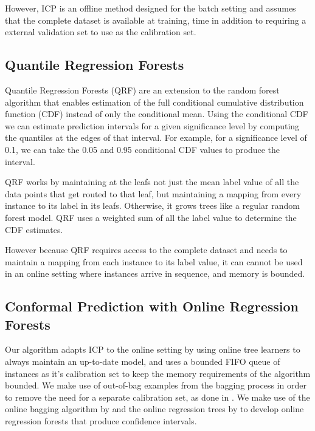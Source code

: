 However, ICP is an offline method designed for the batch setting and assumes that the complete
dataset is available at training, time in addition to requiring a external
validation set to use as the calibration set.


\subsection{Quantile Regression Forests}

Quantile Regression Forests (QRF) \cite{meinshausen2006quantile} are an extension to
the random forest \cite{random-forests} algorithm that enables estimation
of the full conditional cumulative distribution function (CDF) instead of only
the conditional mean. Using the conditional CDF we can estimate prediction
intervals for a given significance level by computing the quantiles at the
edges of that interval. For example, for a significance level of 0.1,
we can take the 0.05 and 0.95 conditional CDF values to produce the interval.

QRF works by maintaining at the leafs not just the mean label value of all
the data points that get routed to that leaf, but maintaining a mapping
from every instance to its label in its leafs. Otherwise, it grows trees
like a regular random forest model. QRF uses a weighted sum of all the label
value to determine the CDF estimates.

However because QRF requires access to the complete dataset and needs to maintain
a mapping from each instance to its label value, it can cannot be used in an online
setting where instances arrive in sequence, and memory is bounded.

\subsection{Conformal Prediction with Online Regression Forests}

Our algorithm adapts ICP to the online setting by using online tree learners
to always maintain an up-to-date model, and uses a bounded FIFO queue of instances
as it's calibration set to keep the memory requirements of the algorithm bounded. We make use of
out-of-bag examples from the bagging process in order to remove the need
for a separate calibration set, as done in \cite{rf-cp-oob}. We make use of
the online bagging algorithm by \citet{Oza2001online} and the online
regression trees by \citet{fimt} to develop online regression forests
that produce confidence intervals.

